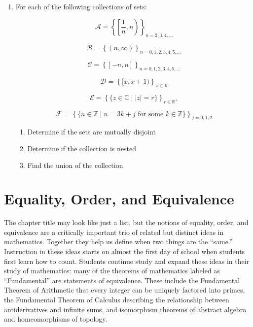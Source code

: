 \documentclass[
]{book}
\providecommand{\tightlist}{%
  \setlength{\itemsep}{0pt}\setlength{\parskip}{0pt}}
\theoremstyle{definition}
\theoremstyle{definition}
\theoremstyle{definition}
\theoremstyle{definition}
\theoremstyle{remark}
\begin{document}
\begin{enumerate}
\def\labelenumi{\arabic{enumi}.}
\item
  For each of the following collections of sets:

  \[\displaystyle{\mathcal{A} = \left\{ \left[ \frac{1}{n},n\right) \right\}_{n=2,3,4,\ldots }}\]

  \[\displaystyle{\mathcal{B} = \left\{ \left( n,\infty \right) \right\}_{n=0,1,2,3,4,5,\ldots} }\]

  \[\displaystyle{\mathcal{C} = \left\{ \left[ -n, n \right] \right\}_{n=0,1,2,3,4,5,\ldots }}\]

  \[\displaystyle{\mathcal{D} = \left\{ [x,x+1)\right\}_{x\in \mathbb{R}}}\]

  \[\displaystyle{\mathcal{E} = \left\{ \{z\in \mathbb{C}\middle \vert|z|=r\}\right\}_{r\in \mathbb{R}^+} }\]

  \[\displaystyle{\mathcal{F} = \left\{ \{n\in \mathbb{Z}\middle \vert n=3k+j \mbox{ for some } k\in \mathbb{Z}\}\right\}_{j=0,1,2}}\]

  \begin{enumerate}
  \def\labelenumii{\alph{enumii}.}
  \tightlist
  \item
    Determine if the sets are mutually disjoint
  \item
    Determine if the collection is nested
  \item
    Find the union of the collection
  \end{enumerate}
\end{enumerate}

\hypertarget{equivalence}{%
\chapter{Equality, Order, and Equivalence}\label{equivalence}}

The chapter title may look like just a list, but the notions of equality, order, and equivalence are a critically important trio of related but distinct ideas in mathematics. Together they help us define when two things are the ``same.'' Instruction in these ideas starts on almost the first day of school when students first learn how to count. Students continue study and expand these ideas in their study of mathematics: many of the theorems of mathematics labeled as ``Fundamental'' are statements of equivalence. These include the Fundamental Theorem of Arithmetic that every integer can be uniquely factored into primes, the Fundamental Theorem of Calculus describing the relationship between antiderivatives and infinite sums, and isomorphism theorems of abstract algebra and homeomorphisms of topology.
\end{document}
